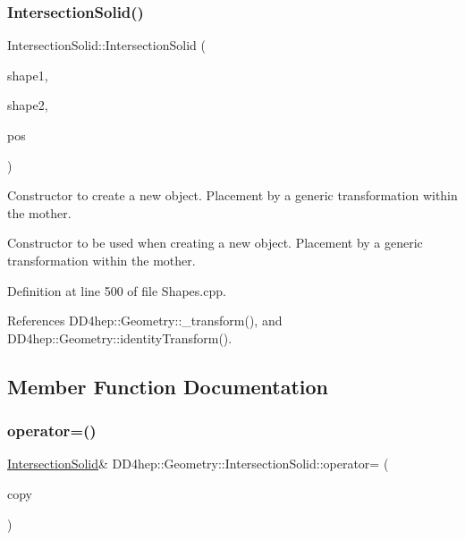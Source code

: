 \subsubsection{\texorpdfstring{Intersection\+Solid()}{IntersectionSolid()}\hspace{0.1cm}{\footnotesize\ttfamily [8/8]}}
{\footnotesize\ttfamily Intersection\+Solid\+::\+Intersection\+Solid (\begin{DoxyParamCaption}\item[{const \hyperlink{namespace_d_d4hep_1_1_geometry_a83de90a8dcc7378ba47d54ef9a6a687b}{Solid} \&}]{shape1,  }\item[{const \hyperlink{namespace_d_d4hep_1_1_geometry_a83de90a8dcc7378ba47d54ef9a6a687b}{Solid} \&}]{shape2,  }\item[{const \hyperlink{namespace_d_d4hep_1_1_geometry_aeb4c0356d12fd7be49a0aae50514e64b}{Transform3D} \&}]{pos }\end{DoxyParamCaption})}



Constructor to create a new object. Placement by a generic transformation within the mother. 

Constructor to be used when creating a new object. Placement by a generic transformation within the mother. 

Definition at line 500 of file Shapes.\+cpp.



References D\+D4hep\+::\+Geometry\+::\+\_\+transform(), and D\+D4hep\+::\+Geometry\+::identity\+Transform().



\subsection{Member Function Documentation}
\hypertarget{class_d_d4hep_1_1_geometry_1_1_intersection_solid_a4a3efd16f6626442cc69114f73ce845a}{}\label{class_d_d4hep_1_1_geometry_1_1_intersection_solid_a4a3efd16f6626442cc69114f73ce845a} 
\subsubsection{\texorpdfstring{operator=()}{operator=()}}
{\footnotesize\ttfamily \hyperlink{class_d_d4hep_1_1_geometry_1_1_intersection_solid}{Intersection\+Solid}\& D\+D4hep\+::\+Geometry\+::\+Intersection\+Solid\+::operator= (\begin{DoxyParamCaption}\item[{const \hyperlink{class_d_d4hep_1_1_geometry_1_1_intersection_solid}{Intersection\+Solid} \&}]{copy }\end{DoxyParamCaption})\hspace{0.3cm}{\ttfamily [default]}}



